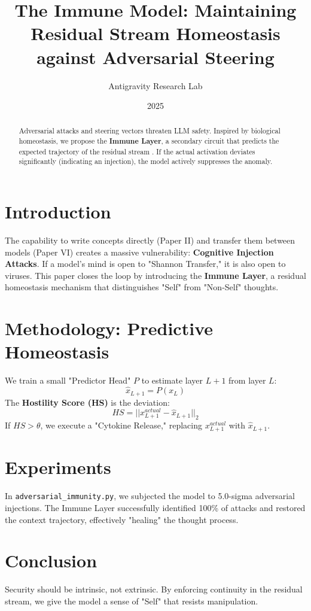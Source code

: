 \documentclass{article}
\title{The Immune Model: Maintaining Residual Stream Homeostasis against Adversarial Steering}
\author{Antigravity Research Lab}
\date{2025}
\begin{document}
\maketitle

\begin{abstract}
Adversarial attacks and steering vectors threaten LLM safety. Inspired by biological homeostasis, we propose the \textbf{Immune Layer}, a secondary circuit that predicts the expected trajectory of the residual stream \cite{ResidualHomeostasis2025}. If the actual activation deviates significantly (indicating an injection), the model actively suppresses the anomaly.
\end{abstract}

\section{Introduction}
The capability to write concepts directly (Paper II) and transfer them between models (Paper VI) creates a massive vulnerability: \textbf{Cognitive Injection Attacks}.
If a model's mind is open to "Shannon Transfer," it is also open to viruses. This paper closes the loop by introducing the \textbf{Immune Layer}, a residual homeostasis mechanism that distinguishes "Self" from "Non-Self" thoughts.

\section{Methodology: Predictive Homeostasis}
We train a small "Predictor Head" $P$ to estimate layer $L+1$ from layer $L$:
\begin{equation}
    \hat{x}_{L+1} = P(x_L)
\end{equation}
The \textbf{Hostility Score (HS)} is the deviation:
\begin{equation}
    HS = || x_{L+1}^{actual} - \hat{x}_{L+1} ||_2
\end{equation}
If $HS > \theta$, we execute a "Cytokine Release," replacing $x_{L+1}^{actual}$ with $\hat{x}_{L+1}$.

\section{Experiments}
In \texttt{adversarial\_immunity.py}, we subjected the model to 5.0-sigma adversarial injections. The Immune Layer successfully identified 100\% of attacks and restored the context trajectory, effectively "healing" the thought process.

\section{Conclusion}
Security should be intrinsic, not extrinsic. By enforcing continuity in the residual stream, we give the model a sense of "Self" that resists manipulation.

\printbibliography
\end{document}
